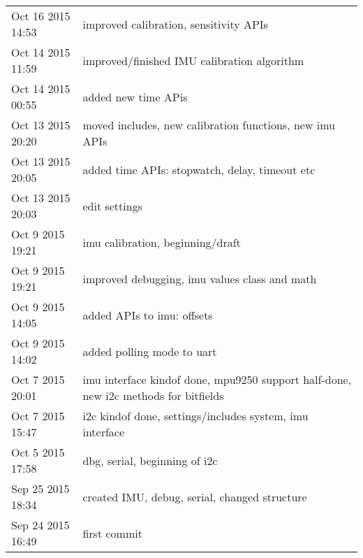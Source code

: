 \begin{tabular}{ l || p{12cm} }
	Oct 16 2015 14:53	& improved calibration, sensitivity APIs	\\
	Oct 14 2015 11:59	& improved/finished IMU calibration algorithm	\\
	Oct 14 2015 00:55	& added new time APis	\\
	Oct 13 2015 20:20	& moved includes, new calibration functions, new imu APIs	\\
	Oct 13 2015 20:05	& added time APIs: stopwatch, delay, timeout etc	\\
	Oct 13 2015 20:03	& edit settings	\\
	Oct 9 2015 19:21	& imu calibration, beginning/draft	\\
	Oct 9 2015 19:21	& improved debugging, imu values class and math	\\
	Oct 9 2015 14:05	& added APIs to imu: offsets	\\
	Oct 9 2015 14:02	& added polling mode to uart	\\
	Oct 7 2015 20:01	& imu interface kindof done, mpu9250 support half-done, new i2c methods for bitfields	\\
	Oct 7 2015 15:47	& i2c kindof done, settings/includes system, imu interface	\\
	Oct 5 2015 17:58	& dbg, serial, beginning of i2c	\\
	Sep 25 2015 18:34	& created IMU, debug, serial, changed structure	\\
	Sep 24 2015 16:49	& first commit	\\
	\hline  
\end{tabular}

